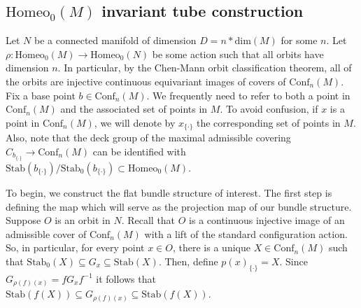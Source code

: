 \documentclass[10pt, oneside]{article}
\newcommand{\homeo}[1][S^1]{\text{Homeo}_0(#1)}
\newcommand{\conf}[2][S^1]{\text{Conf}_{#2}(#1)}
\newcommand{\set}{{\{\cdot\}}}
\newcommand{\stab}[1]{\text{Stab}(#1)}
\newcommand{\pstab}[1]{\text{Stab}_0(#1)}
\newcommand{\maxcov}{C_{b_\set}}
\theoremstyle{definition}
\theoremstyle{definition}
\begin{document}
\subsection{\texorpdfstring{$\homeo[M]$}{Homeo\_0(M)} invariant tube construction}\label{subsec:orbit-bundle-construction}
Let $N$ be a connected manifold of dimension $D=n*\text{dim}(M)$ for some $n$. Let $\rho:\homeo[M]\to\homeo[N]$ be some action such that all orbits have dimension $n$. In particular, by the Chen-Mann orbit classification theorem, all of the orbits are injective continuous equivariant images of covers of $\conf[M]{n}$.
Fix a base point $b\in \conf[M]{n}$.
We frequently need to refer to both a point in $\conf[M]{n}$
and the associated set of points in $M$.
To avoid confusion,
if $x$ is a point in $\conf[M]{n}$,
we will denote by $x_\set$ the corresponding set of points in $M$.
Also,
note that the deck group of the maximal admissible covering $\maxcov \to \conf[M]{n}$ can be identified with $\stab{b_\set}/\pstab{b_\set}\subset\homeo[M]$.

To begin, we construct the flat bundle structure of interest. The first step is defining the map which will serve as the projection map of our bundle structure. Suppose $O$ is an orbit in $N$.
Recall that $O$ is a continuous injective image
of an admissible cover of $\conf[M]{n}$
with a lift of the standard configuration action.
So, in particular,
for every point $x\in O$,
there is a unique $X\in\conf[M]{n}$
such that $\pstab{X} \subseteq G_x \subseteq \stab{X}$.
Then, define $p(x)_\set = X$.
Since $G_{\rho(f)(x)} = f G_x f^{-1}$
it follows that $\stab{f(X)} \subseteq G_{\rho(f)(x)}\subseteq \stab{f(X)}$.
\end{document}
